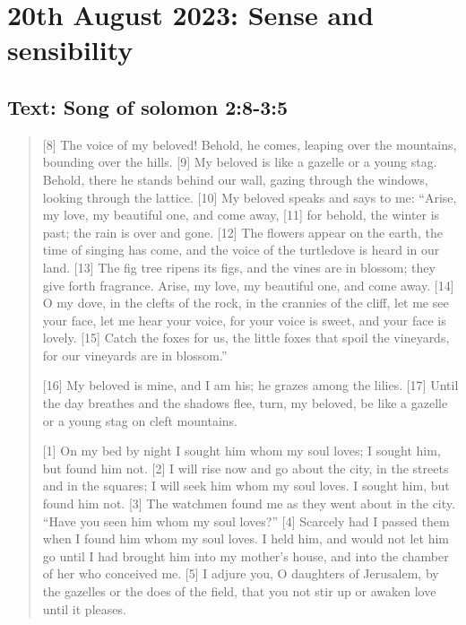 \setcounter{figure}{0}

\section{20th August 2023: Sense and sensibility}
\subsection*{Text: Song of solomon 2:8-3:5}
  \begin{quote}
    [8] The voice of my beloved!
        Behold, he comes,
    leaping over the mountains,
        bounding over the hills.
    [9] My beloved is like a gazelle
        or a young stag.
    Behold, there he stands
        behind our wall,
    gazing through the windows,
        looking through the lattice.
    [10] My beloved speaks and says to me:
    “Arise, my love, my beautiful one,
        and come away,
    [11] for behold, the winter is past;
        the rain is over and gone.
    [12] The flowers appear on the earth,
        the time of singing has come,
    and the voice of the turtledove
        is heard in our land.
    [13] The fig tree ripens its figs,
        and the vines are in blossom;
        they give forth fragrance.
    Arise, my love, my beautiful one,
        and come away.
    [14] O my dove, in the clefts of the rock,
        in the crannies of the cliff,
    let me see your face,
        let me hear your voice,
    for your voice is sweet,
        and your face is lovely.
    [15] Catch the foxes for us,
        the little foxes
    that spoil the vineyards,
        for our vineyards are in blossom.”


    [16] My beloved is mine, and I am his;
        he grazes among the lilies.
    [17] Until the day breathes
        and the shadows flee,
    turn, my beloved, be like a gazelle
        or a young stag on cleft mountains.


        [1] On my bed by night
    I sought him whom my soul loves;
        I sought him, but found him not.
    [2] I will rise now and go about the city,
        in the streets and in the squares;
    I will seek him whom my soul loves.
        I sought him, but found him not.
    [3] The watchmen found me
        as they went about in the city.
    “Have you seen him whom my soul loves?”
    [4] Scarcely had I passed them
        when I found him whom my soul loves.
    I held him, and would not let him go
        until I had brought him into my mother’s house,
        and into the chamber of her who conceived me.
    [5] I adjure you, O daughters of Jerusalem,
        by the gazelles or the does of the field,
    that you not stir up or awaken love
        until it pleases.
  \end{quote}
